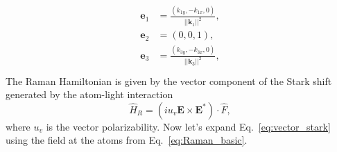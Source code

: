 \begin{align}
\begin{split}
\mathbf{e}_1&=\frac{(k_{1y}, -k_{1x}, 0)}{\vert\vert \mathbf k_1 \vert\vert^2}, \\
\mathbf{e}_2&=(0, 0, 1), \\
\mathbf{e}_3&=\frac{(k_{3y}, -k_{3x}, 0)}{\vert\vert \mathbf k_3 \vert\vert^2}, \\
\label{eq:polarization}
\end{split}
\end{align}
%
The Raman Hamiltonian is given by the vector component of the Stark shift generated by the atom-light interaction
%
\begin{equation}
\hat{H}_R=(iu_v\mathbf E\times\mathbf E^*)\cdot\hat F,
\label{eq:vector_stark}
\end{equation}
%
where $u_v$ is the vector polarizability. Now let's expand Eq.~\ref{eq:vector_stark} using the field at the atoms from Eq.~\ref{eq:Raman_basic}.

